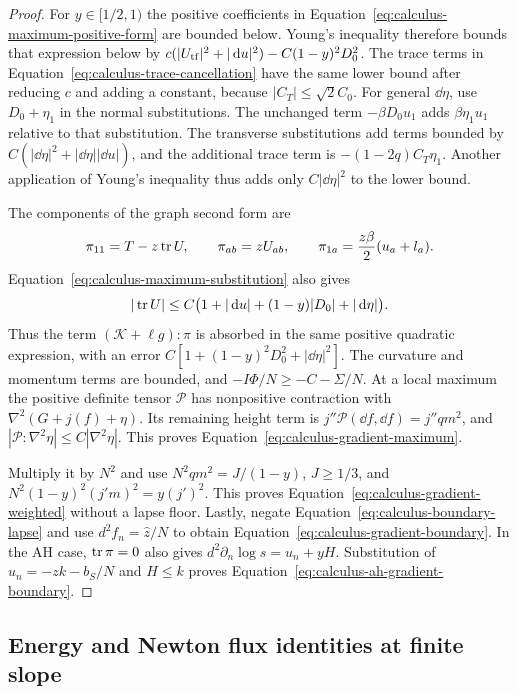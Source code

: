 \begin{proof}
For $y\in[1/2,1)$ the positive coefficients in
Equation~\eqref{eq:calculus-maximum-positive-form} are bounded below.
Young's inequality therefore bounds that expression below by
$c(|U_{\rm tf}|^2+|\mathop{}\!\mathrm d u|^2)-C(1-y)^2D_0^2$.
The trace terms in Equation~\eqref{eq:calculus-trace-cancellation}
have the same lower bound after reducing $c$ and adding a constant,
because $|C_T|\le\sqrt2 C_0$.
For general $\dd\eta$, use $D_0+\eta_1$ in the normal substitutions.
The unchanged term $-\beta D_0u_1$ adds $\beta\eta_1u_1$ relative to
that substitution.  The transverse substitutions add terms bounded by
$C(|\dd\eta|^2+|\dd\eta||\dd u|)$, and the additional trace term is
$-(1-2q)C_T\eta_1$.  Another application of Young's inequality thus
adds only $C|\dd\eta|^2$ to the lower bound.

The components of the graph second form are
\begin{equation}
 \pi_{11}=T-z\operatorname{tr} U,\qquad \pi_{ab}=zU_{ab},\qquad
 \pi_{1a}=\frac{z\beta}{2}(u_a+l_a).
 \label{eq:calculus-second-form-components}
\end{equation}
Equation~\eqref{eq:calculus-maximum-substitution} also gives
\[
 |\operatorname{tr} U|\le C\bigl(1+|\mathop{}\!\mathrm d u|+(1-y)|D_0|+|\mathop{}\!\mathrm d\eta|\bigr).
\]
Thus the term $(\mathcal K+\ell g):\pi$ is absorbed in the same
positive quadratic expression, with an error
$C[1+(1-y)^2D_0^2+|\dd\eta|^2]$.
The curvature and momentum terms are bounded, and
$-I\Phi/N\ge-C-\Sigma/N$.
At a local maximum the positive definite tensor $\mathcal P$ has
nonpositive contraction with $\nabla^2(G+j(f)+\eta)$.
Its remaining height term is $j''\mathcal P(\dd f,\dd f)=j''qm^2$,
and $|\mathcal P:\nabla^2\eta|\le C|\nabla^2\eta|$.
This proves Equation~\eqref{eq:calculus-gradient-maximum}.

Multiply it by $N^2$ and use
$N^2qm^2=J/(1-y)$, $J\ge1/3$, and
$N^2(1-y)^2(j'm)^2=y(j')^2$.
This proves Equation~\eqref{eq:calculus-gradient-weighted} without a
lapse floor.  Lastly, negate
Equation~\eqref{eq:calculus-boundary-lapse} and use
$d^2f_n=\hat z/N$ to obtain
Equation~\eqref{eq:calculus-gradient-boundary}.
In the AH case, $\operatorname{tr}\pi=0$ also gives
$d^2\partial_n\log s=u_n+yH$.
Substitution of $u_n=-zk-b_S/N$ and $H\le k$ proves
Equation~\eqref{eq:calculus-ah-gradient-boundary}.
\end{proof}

\subsection{Energy and Newton flux identities at finite slope}

